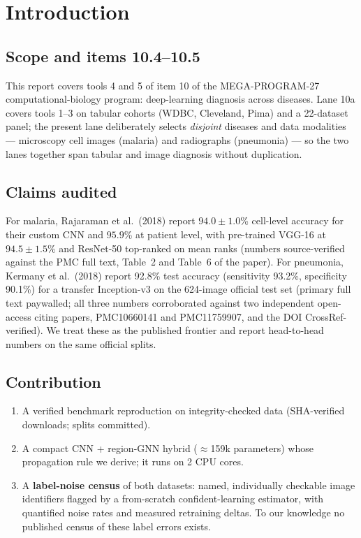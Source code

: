 \section{Introduction}
\subsection{Scope and items 10.4--10.5}
This report covers tools 4 and 5 of item 10 of the MEGA-PROGRAM-27
computational-biology program: deep-learning diagnosis across diseases. Lane
10a covers tools 1--3 on tabular cohorts (WDBC, Cleveland, Pima) and a
22-dataset panel; the present lane deliberately selects \emph{disjoint}
diseases and data modalities --- microscopy cell images (malaria) and
radiographs (pneumonia) --- so the two lanes together span tabular and image
diagnosis without duplication.

\subsection{Claims audited}
For malaria, Rajaraman et al.\ (2018) report $94.0 \pm 1.0$\% cell-level
accuracy for their custom CNN and $95.9$\% at patient level, with pre-trained
VGG-16 at $94.5 \pm 1.5$\% and ResNet-50 top-ranked on mean ranks (numbers
source-verified against the PMC full text, Table~2 and Table~6 of the paper).
For pneumonia, Kermany et al.\ (2018) report 92.8\% test accuracy
(sensitivity 93.2\%, specificity 90.1\%) for a transfer Inception-v3 on the
624-image official test set (primary full text paywalled; all three numbers
corroborated against two independent open-access citing papers, PMC10660141
and PMC11759907, and the DOI CrossRef-verified). We treat these as the published frontier and
report head-to-head numbers on the same official splits.

\subsection{Contribution}
\begin{enumerate}
\item A verified benchmark reproduction on integrity-checked data
(SHA-verified downloads; splits committed).
\item A compact CNN + region-GNN hybrid ($\approx$159k parameters) whose
propagation rule we derive; it runs on 2 CPU cores.
\item A \textbf{label-noise census} of both datasets: named, individually checkable
image identifiers flagged by a from-scratch confident-learning estimator,
with quantified noise rates and measured retraining deltas. To our knowledge
no published census of these label errors exists.
\end{enumerate}

